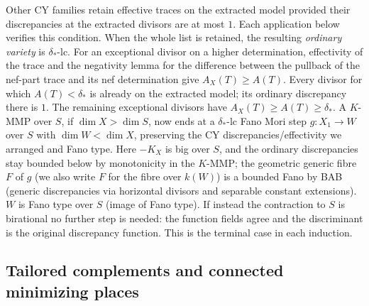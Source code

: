 Other CY families retain effective traces on the extracted model
provided their discrepancies at the extracted divisors are at most
\(1\).  Each application below verifies this condition.
When the whole list is retained, the resulting \emph{ordinary variety}
is \(\delta_*\)-lc.  For an exceptional divisor on a higher
determination, effectivity of the trace and the negativity lemma for
the difference between the pullback of the nef-part trace and its nef
determination give \(A_X(T)\ge A(T)\).  Every divisor for which
\(A(T)<\delta_*\) is already on the extracted model; its ordinary
discrepancy there is \(1\).  The remaining exceptional divisors have
\(A_X(T)\ge A(T)\ge\delta_*\).
A \(K\)-MMP over \(S\), if \(\dim X>\dim S\), now ends at a \(\delta_*\)-lc Fano Mori step \(g:X_1\to W\) over \(S\) with \(\dim W<\dim X\), preserving the CY discrepancies/effectivity we arranged and Fano type.
Here \(-K_X\) is big over \(S\), and the ordinary discrepancies stay bounded below by monotonicity in the \(K\)-MMP; the geometric generic fibre \(F\) of \(g\) (we also write \(F\) for the fibre over \(k(W)\)) is a bounded Fano by BAB (generic discrepancies via horizontal divisors and separable constant extensions). \(W\) is Fano type over \(S\) (image of Fano type).
If instead the contraction to \(S\) is birational no further step is
needed: the function fields agree and the discriminant is the original
discrepancy function.  This is the terminal case in each induction.

\subsection{Tailored complements and connected minimizing places}

